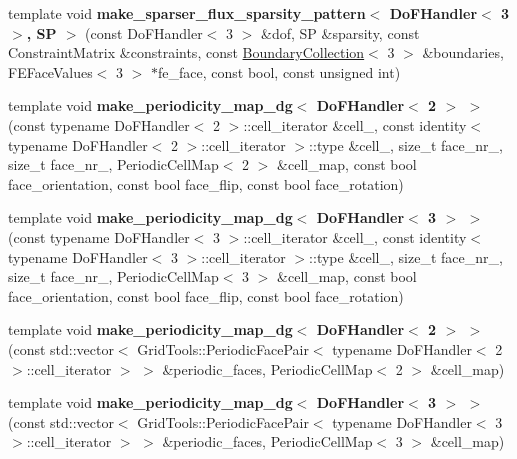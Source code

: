 \begin{DoxyCompactItemize}
\item 
\hypertarget{namespacenatrium_1_1DealIIExtensions_a6bfd0edfcc602aa68f3e5e627a5f1e8b}{
template void {\bfseries make\_\-sparser\_\-flux\_\-sparsity\_\-pattern$<$ DoFHandler$<$ 3 $>$, SP $>$} (const DoFHandler$<$ 3 $>$ \&dof, SP \&sparsity, const ConstraintMatrix \&constraints, const \hyperlink{classnatrium_1_1BoundaryCollection}{BoundaryCollection}$<$ 3 $>$ \&boundaries, FEFaceValues$<$ 3 $>$ $\ast$fe\_\-face, const bool, const unsigned int)}
\label{namespacenatrium_1_1DealIIExtensions_a6bfd0edfcc602aa68f3e5e627a5f1e8b}

\item 
\hypertarget{namespacenatrium_1_1DealIIExtensions_aec93b076a99e59c28b7921e26d81b450}{
template void {\bfseries make\_\-periodicity\_\-map\_\-dg$<$ DoFHandler$<$ 2 $>$ $>$} (const typename DoFHandler$<$ 2 $>$::cell\_\-iterator \&cell\_, const identity$<$ typename DoFHandler$<$ 2 $>$::cell\_\-iterator $>$::type \&cell\_, size\_\-t face\_\-nr\_, size\_\-t face\_\-nr\_, PeriodicCellMap$<$ 2 $>$ \&cell\_\-map, const bool face\_\-orientation, const bool face\_\-flip, const bool face\_\-rotation)}
\label{namespacenatrium_1_1DealIIExtensions_aec93b076a99e59c28b7921e26d81b450}

\item 
\hypertarget{namespacenatrium_1_1DealIIExtensions_aff90e32d1a427e62cb287350abe90ba0}{
template void {\bfseries make\_\-periodicity\_\-map\_\-dg$<$ DoFHandler$<$ 3 $>$ $>$} (const typename DoFHandler$<$ 3 $>$::cell\_\-iterator \&cell\_, const identity$<$ typename DoFHandler$<$ 3 $>$::cell\_\-iterator $>$::type \&cell\_, size\_\-t face\_\-nr\_, size\_\-t face\_\-nr\_, PeriodicCellMap$<$ 3 $>$ \&cell\_\-map, const bool face\_\-orientation, const bool face\_\-flip, const bool face\_\-rotation)}
\label{namespacenatrium_1_1DealIIExtensions_aff90e32d1a427e62cb287350abe90ba0}

\item 
\hypertarget{namespacenatrium_1_1DealIIExtensions_aa7db4d0d0c8236483eb98b0f09e79b89}{
template void {\bfseries make\_\-periodicity\_\-map\_\-dg$<$ DoFHandler$<$ 2 $>$ $>$} (const std::vector$<$ GridTools::PeriodicFacePair$<$ typename DoFHandler$<$ 2 $>$::cell\_\-iterator $>$ $>$ \&periodic\_\-faces, PeriodicCellMap$<$ 2 $>$ \&cell\_\-map)}
\label{namespacenatrium_1_1DealIIExtensions_aa7db4d0d0c8236483eb98b0f09e79b89}

\item 
\hypertarget{namespacenatrium_1_1DealIIExtensions_a9da850ee914812ca5d374fe70461f170}{
template void {\bfseries make\_\-periodicity\_\-map\_\-dg$<$ DoFHandler$<$ 3 $>$ $>$} (const std::vector$<$ GridTools::PeriodicFacePair$<$ typename DoFHandler$<$ 3 $>$::cell\_\-iterator $>$ $>$ \&periodic\_\-faces, PeriodicCellMap$<$ 3 $>$ \&cell\_\-map)}
\label{namespacenatrium_1_1DealIIExtensions_a9da850ee914812ca5d374fe70461f170}


\end{DoxyCompactItemize}
